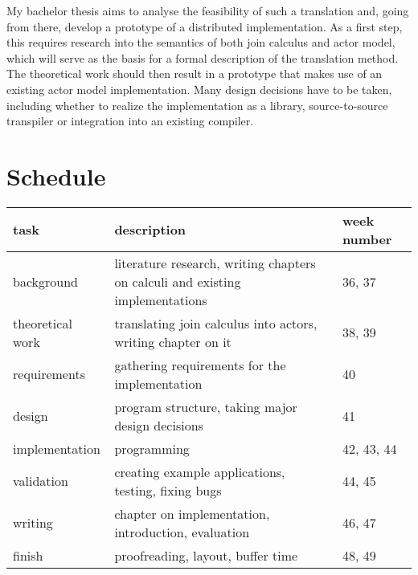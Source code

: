 \documentclass[12pt]{article}
\begin{document}
My bachelor thesis aims to analyse the feasibility of such a translation and, going from there, develop a prototype of a distributed implementation.
As a first step, this requires research into the semantics of both join calculus and actor model, which will serve as the basis for a formal description of the translation method.
The theoretical work should then result in a prototype that makes use of an existing actor model implementation.
Many design decisions have to be taken, including whether to realize the implementation as a library, source-to-source transpiler or integration into an existing compiler.


\section*{Schedule}

\begin{tabular}{| p{3cm} | p{7cm} | p{2.45cm} |}
  \hline
    task &
    description &
    week number \\
  \hline
    background &
    literature research, writing chapters on calculi and existing implementations &
    36, 37 \\
  \hline
    theoretical work &
    translating join calculus into actors, writing chapter on it &
    38, 39 \\
  \hline
    requirements &
    gathering requirements for the implementation &
    40 \\
  \hline
    design &
    program structure, taking major design decisions &
    41 \\
  \hline
    implementation &
    programming &
    42, 43, 44 \\
  \hline
    validation &
    creating example applications, testing, fixing bugs &
    44, 45 \\
  \hline
    writing &
    chapter on implementation, introduction, evaluation &
    46, 47 \\
  \hline
    finish &
    proofreading, layout, buffer time &
    48, 49 \\
  \hline
\end{tabular}

\nocite{levy_results_1997}
\nocite{maranget_compiling_1998}
\nocite{hewitt_viewing_1977}
\nocite{agha_actors_1986}

\pagebreak
{}

\end{document}
